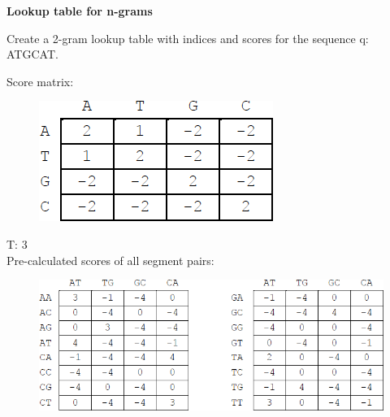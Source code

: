 \question \textbf{Lookup table for n-grams}
  
Create a 2-gram lookup table with indices and scores for the sequence q: ATGCAT. 

Score matrix:
\begin{figure}[H]
      \centering
      \includegraphics[width=0.25 \textwidth]{fig05/score_scheme_2.png}
\end{figure}

 T: 3 \\

Pre-calculated scores of all segment pairs:
\begin{figure}[H]
      \centering
      \includegraphics[width=0.65 \textwidth]{fig05/lookup_table_precalculated.png}
\end{figure}


